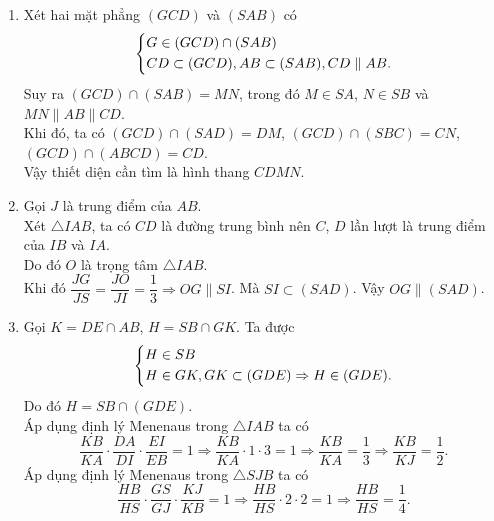 \begin{bt}
{\begin{enumerate}
\begin{itemize}
		$$\heva{&S\in (SDC)\cap (SAB)\\ &DC\subset (SDC), AB\subset (SAB), DC\parallel AB.}$$
		Do đó $(SDC)\cap (SAB)=\Delta$, trong đó $\Delta$ là đường thẳng đi qua $S$ và $\Delta\parallel AB$.
		\item Gọi $I$ là giao điểm của $AD$ và $BC$. Khi đó 
		$$\heva{&S\in (SAD)\cap (SBC)\\ &I\in (SAD\cap (SBC).}$$
		Suy ra $(SAD)\cap (SBC)=SI$.
	\end{itemize}
\item Xét hai mặt phẳng $(GCD)$ và $(SAB)$ có
$$\left\{\begin{aligned}&G\in (GCD)\cap (SAB)\\ &CD\subset (GCD), AB\subset (SAB), CD\parallel AB.\end{aligned}\right.$$
Suy ra $(GCD)\cap (SAB)=MN$, trong đó $M\in SA$, $N\in SB$ và $MN\parallel AB\parallel CD$.\\
Khi đó, ta có $(GCD)\cap (SAD)=DM$, $(GCD)\cap (SBC)=CN$, $(GCD)\cap (ABCD)=CD$.\\
Vậy thiết diện cần tìm là hình thang $CDMN$.
\item Gọi $J$ là trung điểm của $AB$.\\
Xét $\triangle IAB$, ta có $CD$ là đường trung bình nên $C$, $D$ lần lượt là trung điểm của $IB$ và $IA$.\\
Do đó $O$ là trọng tâm $\triangle IAB$.\\
Khi đó $\dfrac{JG}{JS}=\dfrac{JO}{JI}=\dfrac{1}{3}\Rightarrow OG\parallel SI$. Mà $SI\subset (SAD)$. Vậy $OG\parallel (SAD)$. 
\item Gọi $K=DE\cap AB$, $H=SB\cap GK$. Ta được 
$$\left\{\begin{aligned}&H\in SB\\ &H\in GK, GK\subset (GDE)\Rightarrow H\in (GDE).\end{aligned}\right.$$
Do đó $H=SB\cap (GDE)$.\\
Áp dụng định lý Menenaus trong $\triangle IAB$ ta có 
$$\dfrac{KB}{KA}\cdot \dfrac{DA}{DI}\cdot \dfrac{EI}{EB}=1\Rightarrow \dfrac{KB}{KA}\cdot 1\cdot 3=1\Rightarrow \dfrac{KB}{KA}=\dfrac{1}{3}\Rightarrow \dfrac{KB}{KJ}=\dfrac{1}{2}.$$
Áp dụng định lý Menenaus trong $\triangle SJB$ ta có 
$$\dfrac{HB}{HS}\cdot \dfrac{GS}{GJ}\cdot \dfrac{KJ}{KB}=1\Rightarrow \dfrac{HB}{HS}\cdot 2\cdot 2=1\Rightarrow \dfrac{HB}{HS}=\dfrac{1}{4}.$$
\end{enumerate}
}
\end{bt}
	
